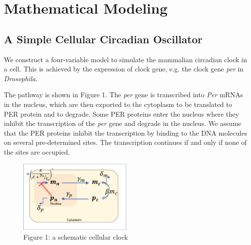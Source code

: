 \documentclass[12pt]{article}
\renewcommand{\(}{\left (}
\renewcommand{\)}{\right )}
\begin{document}
\section{Mathematical Modeling}
\subsection{A Simple Cellular Circadian Oscillator}
\hspace{5mm} We construct a four-variable model to simulate the mammalian circadian clock in a cell. This is achieved by the expression of clock gene, e.g. the clock gene \textit{per} in \textit{Drosophila}.

The pathway is shown in Figure 1. The \textit{per} gene is transcribed into \textit{Per} mRNAs in the nucleus, which are then exported to the cytoplasm to be translated to PER protein and to degrade. Some PER proteins enter the nucleus where they inhibit the transcription of the \textit{per} gene and degrade in the nucleus. We assume that the PER proteins inhibit the transcription by binding to the DNA molecules on several pre-determined sites. The transcription continues if and only if none of the sites are occupied.


\begin {figure}[h]
	\centering
	\includegraphics[width=0.5\textwidth]{pathway.png}
	\caption*{\small Figure 1: a schematic cellular clock}
\end {figure}
\end{document}

